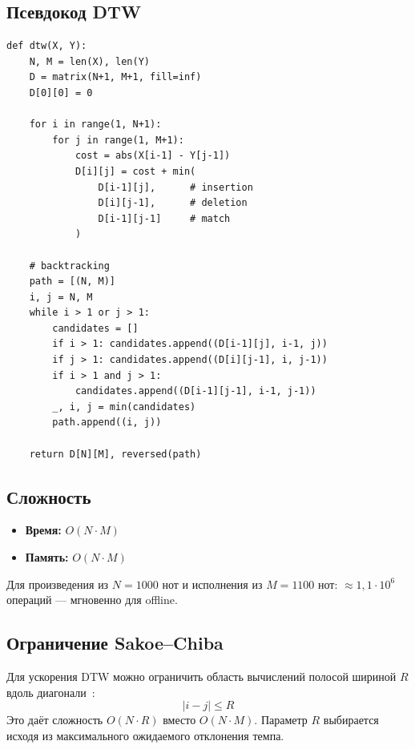 \documentclass[a4paper,11pt]{article}
\begin{document}
\subsection{Псевдокод DTW}

\begin{algbox}[title={Алгоритм DTW}]
\begin{lstlisting}[style=python, numbers=none]
def dtw(X, Y):
    N, M = len(X), len(Y)
    D = matrix(N+1, M+1, fill=inf)
    D[0][0] = 0

    for i in range(1, N+1):
        for j in range(1, M+1):
            cost = abs(X[i-1] - Y[j-1])
            D[i][j] = cost + min(
                D[i-1][j],      # insertion
                D[i][j-1],      # deletion
                D[i-1][j-1]     # match
            )

    # backtracking
    path = [(N, M)]
    i, j = N, M
    while i > 1 or j > 1:
        candidates = []
        if i > 1: candidates.append((D[i-1][j], i-1, j))
        if j > 1: candidates.append((D[i][j-1], i, j-1))
        if i > 1 and j > 1:
            candidates.append((D[i-1][j-1], i-1, j-1))
        _, i, j = min(candidates)
        path.append((i, j))

    return D[N][M], reversed(path)
\end{lstlisting}
\end{algbox}

\subsection{Сложность}

\begin{formulabox}[title={Сложность DTW}]
\begin{itemize}[leftmargin=1.5em]
  \item \textbf{Время:} $O(N \cdot M)$
  \item \textbf{Память:} $O(N \cdot M)$
\end{itemize}
Для произведения из $N = 1000$ нот и исполнения из $M = 1100$ нот:
$\approx 1{,}1 \cdot 10^6$ операций --- мгновенно для offline.
\end{formulabox}

\subsection{Ограничение Sakoe--Chiba}

Для ускорения DTW можно ограничить область вычислений полосой
шириной $R$ вдоль диагонали~\cite{sakoe1978}:
\[
  |i - j| \leq R
\]
Это даёт сложность $O(N \cdot R)$ вместо $O(N \cdot M)$. Параметр $R$
выбирается исходя из максимального ожидаемого отклонения темпа.
\end{document}
